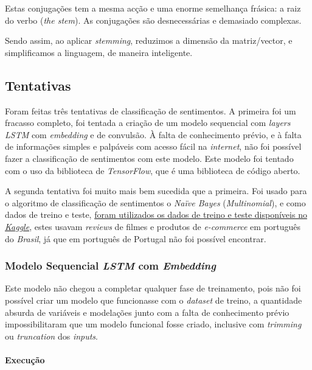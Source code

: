 Estas conjugações tem a mesma acção e uma enorme semelhança frásica: a raiz do verbo (\textit{the stem}). As conjugações são desnecessárias e demasiado complexas.

Sendo assim, ao aplicar \textit{stemming}, reduzimos a dimensão da matriz/vector, e simplificamos a linguagem, de maneira inteligente.

\subsection{Tentativas}

Foram feitas três tentativas de classificação de sentimentos. A primeira foi um fracasso completo, foi tentada a criação de um modelo sequencial com \textit{layers LSTM} com \textit{embedding} e de convulsão. À falta de conhecimento prévio, e à falta de informações simples e palpáveis com acesso fácil na \textit{internet}, não foi possível fazer a classificação de sentimentos com este modelo. Este modelo foi tentado com o uso da biblioteca de \textit{TensorFlow}, que é uma biblioteca de código aberto.

A segunda tentativa foi muito mais bem sucedida que a primeira. Foi usado para o algoritmo de classificação de sentimentos o \textit{Naïve Bayes} (\textit{Multinomial}), e como dados de treino e teste, \href{https://www.kaggle.com/fredericods/ptbr-sentiment-analysis-datasets}{foram utilizados os dados de treino e teste disponíveis no \textit{Kaggle}}, estes usavam \textit{reviews} de filmes e produtos de \textit{e-commerce} em português do \textit{Brasil}, já que em português de Portugal não foi possível encontrar.

\subsubsection{Modelo Sequencial \textit{LSTM} com \textit{Embedding}}

Este modelo não chegou a completar qualquer fase de treinamento, pois não foi possível criar um modelo que funcionasse com o \textit{dataset} de treino, a quantidade absurda de variáveis e modelações junto com a falta de conhecimento prévio impossibilitaram que um modelo funcional fosse criado, inclusive com \textit{trimming} ou \textit{truncation} dos \textit{inputs}.

\paragraph{Execução\\}

